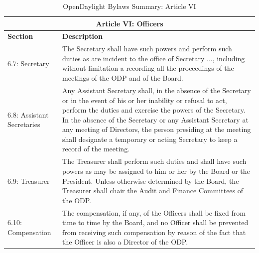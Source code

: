 \documentclass[a4paper, 12pt]{book}
\begin{document}
{\begin{table}[H]
  \begin{center}
    \begin{tabular}{ | p{4cm} | p{11cm} | }
    \toprule
    \multicolumn {2}{|c|}{\textbf{Article VI: Officers}} \\
    \hline
    \textbf{Section} & \textbf{Description} \\
    \hline
    6.7: Secretary & The Secretary shall have such powers and perform such duties as are incident to the office of Secretary ..., including without limitation a recording all the proceedings of the meetings of the ODP and of the Board.\\
    \hline
    6.8: Assistant Secretaries & Any Assistant Secretary shall, in the absence of the Secretary or in the event of his or her inability or refusal to act, perform the duties and exercise the powers of the Secretary.  In the absence of the Secretary or any Assistant Secretary at any meeting of Directors, the person presiding at the meeting shall designate a temporary or acting Secretary to keep a record of the meeting.\\
    \hline
    6.9: Treasurer & The Treasurer shall perform such duties and shall have such powers as may be assigned to him or her by the Board or the President.  Unless otherwise determined by the Board, the Treasurer shall chair the Audit and Finance Committees of the ODP.\\
    \hline
    6.10: Compensation & The compensation, if any, of the Officers shall be fixed from time to time by the Board, and no Officer shall be prevented from receiving such compensation by reason of the fact that the Officer is also a Director of the ODP.\\
    \bottomrule
    \end{tabular}
    \caption{OpenDaylight Bylaws Summary: Article VI}
    \label{tab:odlbylaws-art06}
  \end{center}
\end{table}

}
\end{document}
